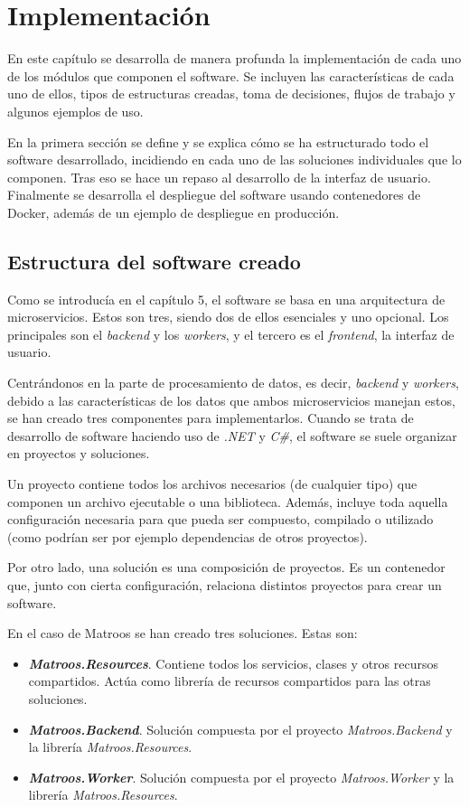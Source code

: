 \chapter{Implementación}

En este capítulo se desarrolla de manera profunda la implementación de cada uno de los módulos que componen el software. Se incluyen las características de cada uno de ellos, tipos de estructuras creadas, toma de decisiones, flujos de trabajo y algunos ejemplos de uso.

En la primera sección se define y se explica cómo se ha estructurado todo el software desarrollado, incidiendo en cada uno de las soluciones individuales que lo componen. Tras eso se hace un repaso al desarrollo de la interfaz de usuario. Finalmente se desarrolla el despliegue del software usando contenedores de Docker, además de un ejemplo de despliegue en producción.


\section{Estructura del software creado}

Como se introducía en el capítulo 5, el software se basa en una arquitectura de microservicios. Estos son tres, siendo dos de ellos esenciales y uno opcional. Los principales son el \textit{backend} y los \textit{workers}, y el tercero es el \textit{frontend}, la interfaz de usuario.

Centrándonos en la parte de procesamiento de datos, es decir, \textit{backend} y \textit{workers}, debido a las características de los datos que ambos microservicios manejan estos, se han creado tres componentes para implementarlos. Cuando se trata de desarrollo de software haciendo uso de \textit{.NET} y \textit{C\#}, el software se suele organizar en proyectos y soluciones.

Un proyecto contiene todos los archivos necesarios (de cualquier tipo) que componen un archivo ejecutable o una biblioteca. Además, incluye toda aquella configuración necesaria para que pueda ser compuesto, compilado o utilizado (como podrían ser por ejemplo dependencias de otros proyectos).

Por otro lado, una solución es una composición de proyectos. Es un contenedor que, junto con cierta configuración, relaciona distintos proyectos para crear un software.

En el caso de Matroos se han creado tres soluciones. Estas son:

\begin{itemize}
	\item \textbf{\textit{Matroos.Resources}}. Contiene todos los servicios, clases y otros recursos compartidos. Actúa como librería de recursos compartidos para las otras soluciones.
	\item \textbf{\textit{Matroos.Backend}}. Solución compuesta por el proyecto \textit{Matroos.Backend} y la librería \textit{Matroos.Resources}.
	\item \textbf{\textit{Matroos.Worker}}. Solución compuesta por el proyecto \textit{Matroos.Worker} y la librería \textit{Matroos.Resources}.
\end{itemize}

